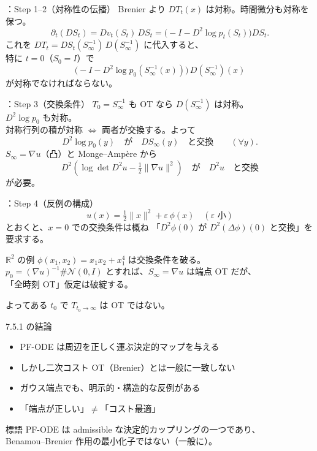 \assuppl
\begin{frame}{\supplmark：Step 1--2（対称性の伝播）}
    Brenier より $DT_t(x)$ は対称。時間微分も対称を保つ。
    \[
        \partial_t(DS_t)=Dv_t(S_t)\,DS_t
        =\bigl(-I-D^2\log p_t(S_t)\bigr)DS_t.
    \]
    これを $DT_t=DS_t(S_\infty^{-1})\,D(S_\infty^{-1})$ に代入すると、\\
    特に $t=0$（$S_0=I$）で
    \[
        \bigl(-I-D^2\log p_0(S_\infty^{-1}(x))\bigr)\,D(S_\infty^{-1})(x)
    \]
    が対称でなければならない。
\end{frame}
\assuppl
\begin{frame}{\supplmark：Step 3（交換条件）}
    $T_0=S_\infty^{-1}$ も OT なら $D(S_\infty^{-1})$ は対称。\\
    $D^2\log p_0$ も対称。\\
    対称行列の積が対称 $\Leftrightarrow$ 両者が交換する。よって
    \[
        D^2\log p_0(y)
        \quad\text{が}\quad
        DS_\infty(y)
        \quad\text{と交換}
        \qquad(\forall y).
    \]
    $S_\infty=\nabla u$（凸）と Monge--Amp\`ere から
    \[
        D^2\!\left(\log\det D^2 u-\tfrac12\|\nabla u\|^2\right)
        \quad\text{が}\quad
        D^2 u
        \quad\text{と交換}
        \tag{7.5.1}
    \]
    が必要。
\end{frame}
\assuppl
\begin{frame}{\supplmark：Step 4（反例の構成）}
    \[
        u(x)=\tfrac12\|x\|^2+\varepsilon\,\phi(x)
        \quad(\varepsilon\text{ 小})
    \]
    とおくと、$x=0$ での交換条件は概ね
    「$D^2\phi(0)$ が $D^2(\Delta\phi)(0)$ と交換」を要求する。
    \begin{exampleblock}{$\mathbb{R}^2$ の例}
        $\phi(x_1,x_2)=x_1 x_2+x_1^4$ は交換条件を破る。\\
        $p_0=(\nabla u)^{-1}\#\mathcal{N}(0,I)$ とすれば、$S_\infty=\nabla u$ は端点 OT だが、\\
        「全時刻 OT」仮定は破綻する。
    \end{exampleblock}
    よってある $t_0$ で $T_{t_0\to\infty}$ は OT ではない。
\end{frame}
\asmain
\begin{frame}{7.5.1 の結論}
    \begin{itemize}
        \item PF-ODE は周辺を正しく運ぶ決定的マップを与える
        \item しかし二次コスト OT（Brenier）とは一般に一致しない
        \item ガウス端点でも、明示的・構造的な反例がある
        \item 「端点が正しい」$\neq$「コスト最適」
    \end{itemize}
    \begin{alertblock}{標語}
        PF-ODE は admissible な決定的カップリングの一つであり、\\
        Benamou--Brenier 作用の最小化子ではない（一般に）。
    \end{alertblock}
\end{frame}
